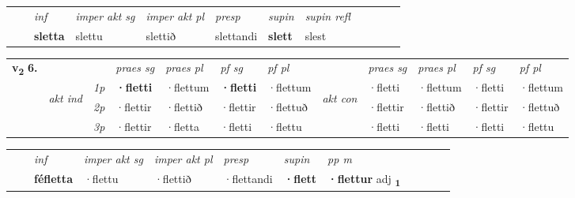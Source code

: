 \begin{tabular}{llllllllllll}
 & & \textit{inf} & \textit{imper akt sg} & \textit{imper akt pl}   & \textit{presp} & \textit{supin} & \textit{supin refl}      \\*
  & & \textbf{sletta} & slettu  & slettið   & slettandi &  \textbf{slett} & slest  \\*
\cmidrule{1-12}
\end{tabular}



\begin{tabular}{llllllllllll} \toprule
\multirow{4}{*}{{{\textbf{v{\textsubscript{2}}} \Large{\textbf{6.}}}}}  & &   &  \textit{praes sg}  & \textit{praes pl}  &\textit{ pf sg} & \textit{pf pl} &  &  \textit{praes sg}  & \textit{praes pl}  & \textit{pf sg} & \textit{pf pl } \\*
	\cmidrule{4-7} \cmidrule{9-12}
 & \multirow{3}{*}{\begin{turn}{90}\textit{akt ind}\end{turn}} & {\textit{1p}} & \textbf{·fletti} & ·flettum    & \textbf{·fletti} & ·flettum & \multirow{3}{*}{\begin{turn}{90}\textit{akt con}\end{turn}} &·fletti & ·flettum & ·fletti & ·flettum\\*
& &  {\textit{2p}} &  ·flettir  & ·flettið   & ·flettir & ·flettuð & & ·flettir & ·flettið & ·flettir & ·flettuð \\*
& &  {\textit{3p}} & ·flettir & ·fletta   & ·fletti & ·flettu & & ·fletti & ·fletti& ·fletti & ·flettu  \\*
\cmidrule{4-7} \cmidrule{9-12}
\end{tabular}


\begin{tabular}{llllllllllll}
 & & \textit{inf} & \textit{imper akt sg} & \textit{imper akt pl}   & \textit{presp} & \textit{supin}  & \textit{pp m}     \\*
  & & \textbf{féfletta} & ·flettu  & ·flettið   & ·flettandi &  \textbf{·flett}  & \textbf{·flettur} adj \textbf{\textsubscript{1}} \\*
\cmidrule{1-12}
\end{tabular}



